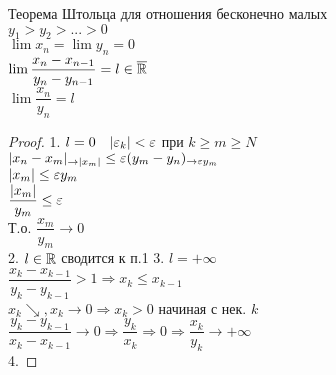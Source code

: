 	
\begin{theorem}
	Теорема Штольца для отношения бесконечно малых\\
	$ y_1 > y_2 > ... > 0 $ \\
	$ \lim x_n = \lim y_n = 0 $ \\
	$ \lim \dfrac{x_n - x_{n-1}}{y_n - y_{n-1}} = l \in \overline{\mathbb{R}} $ \\
	$ \lim \dfrac{x_n}{y_n} = l $ \\
	\begin{proof}
		1. $l = 0 \ \ \ | \varepsilon_k | < \varepsilon $ при $ k \geq m \geq N $ \\
		$ | x_n - x_m |_{\rightarrow |x_m|} \leq \varepsilon (y_m - y_n)_{\rightarrow \varepsilon y_m} $ \\
		$ |x_m| \leq \varepsilon y_m $ \\
		$ \dfrac{|x_m|}{y_m} \leq \varepsilon $ \\
		Т.о. $ \dfrac{x_m}{y_m} \rightarrow 0 $ \\
		2. $ l \in \mathbb{R} $ сводится к п.1
		3. $ l = + \infty $ \\
		$ \dfrac{ x_k - x_{k-1}}{y_k - y_{k-1}} > 1 \Rightarrow x_k \leq x_{k-1} $\\
		$ x_k \searrow, x_k \rightarrow 0 \Rightarrow x_k > 0$ начиная с нек. $k$ \\
		$ \dfrac{y_k - y_{k-1}}{x_k - x_{k-1}} \rightarrow 0 \Rightarrow \dfrac{y_k}{x_k} \Rightarrow 0 \Rightarrow \dfrac{x_k}{y_k} \rightarrow +\infty $\\
		4. 
 	\end{proof}
\end{theorem}



